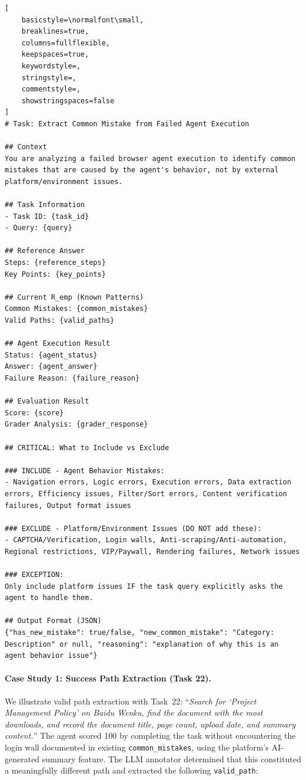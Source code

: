 \begin{tcolorbox}[
  title={Failure Case $\rightarrow$ Extract \texttt{common\_mistake}},
  colback=white,
  colframe=tableblueTitle,
  colbacktitle=tableblueTitle,
  coltitle=white,
  fonttitle=\bfseries,
  breakable,
  enhanced,
  boxrule=1.2pt,
  arc=1.5mm
]
\begin{lstlisting}[
    basicstyle=\normalfont\small,
    breaklines=true,
    columns=fullflexible,
    keepspaces=true,
    keywordstyle=,
    stringstyle=,
    commentstyle=,
    showstringspaces=false
]
# Task: Extract Common Mistake from Failed Agent Execution

## Context
You are analyzing a failed browser agent execution to identify common mistakes that are caused by the agent's behavior, not by external platform/environment issues.

## Task Information
- Task ID: {task_id}
- Query: {query}

## Reference Answer
Steps: {reference_steps}
Key Points: {key_points}

## Current R_emp (Known Patterns)
Common Mistakes: {common_mistakes}
Valid Paths: {valid_paths}

## Agent Execution Result
Status: {agent_status}
Answer: {agent_answer}
Failure Reason: {failure_reason}

## Evaluation Result
Score: {score}
Grader Analysis: {grader_response}

## CRITICAL: What to Include vs Exclude

### INCLUDE - Agent Behavior Mistakes:
- Navigation errors, Logic errors, Execution errors, Data extraction errors, Efficiency issues, Filter/Sort errors, Content verification failures, Output format issues

### EXCLUDE - Platform/Environment Issues (DO NOT add these):
- CAPTCHA/Verification, Login walls, Anti-scraping/Anti-automation, Regional restrictions, VIP/Paywall, Rendering failures, Network issues

### EXCEPTION:
Only include platform issues IF the task query explicitly asks the agent to handle them.

## Output Format (JSON)
{"has_new_mistake": true/false, "new_common_mistake": "Category: Description" or null, "reasoning": "explanation of why this is an agent behavior issue"}
\end{lstlisting}
\end{tcolorbox}

\paragraph{Case Study 1: Success Path Extraction (Task 22).}
We illustrate valid path extraction with Task~22: ``\textit{Search for `Project Management Policy' on Baidu Wenku, find the document with the most downloads, and record the document title, page count, upload date, and summary content.}'' The agent scored 100 by completing the task without encountering the login wall documented in existing \texttt{common\_mistakes}, using the platform's AI-generated summary feature. The LLM annotator determined that this constituted a meaningfully different path and extracted the following \texttt{valid\_path}:

